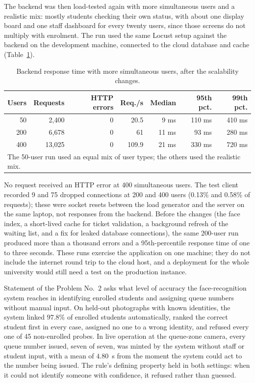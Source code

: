 \documentclass{research}
\begin{document}
The backend was then load-tested again with more simultaneous users and
a realistic mix: mostly students checking their own status, with about
one display board and one staff dashboard for every twenty users, since
those screens do not multiply with enrolment. The run used the same
Locust setup against the backend on the development machine, connected
to the cloud database and cache (Table~\ref{tab:scale-load}).

\begin{table}[H]
\centering
\caption{Backend response time with more simultaneous users, after the
scalability changes.}
\label{tab:scale-load}
\begin{tabular}{rrrrrrr}
\hline
Users & Requests & HTTP errors & Req./s & Median & 95th pct. & 99th pct. \\
\hline
50  & 2,400  & 0 & 20.5  & 9 ms  & 110 ms & 410 ms \\
200 & 6,678  & 0 & 61    & 11 ms & 93 ms  & 280 ms \\
400 & 13,025 & 0 & 109.9 & 21 ms & 330 ms & 720 ms \\
\hline
\multicolumn{7}{l}{\footnotesize The 50-user run used an equal mix of
user types; the others used the realistic mix.} \\
\end{tabular}
\end{table}

\noindent No request received an HTTP error at 400 simultaneous users.
The test client recorded 9 and 75 dropped connections at 200 and 400
users (0.13\% and 0.58\% of requests); these were socket resets between
the load generator and the server on the same laptop, not responses from
the backend. Before the changes (the face index, a short-lived cache
for ticket validation, a background refresh of the waiting list, and a
fix for leaked database connections), the same 200-user run produced
more than a thousand errors and a 95th-percentile response time of one to
three seconds. These runs exercise the application on one machine; they
do not include the internet round trip to the cloud host, and a
deployment for the whole university would still need a test on the
production instance.

\label{subsec:sop2-scope}

Statement of the Problem No.~2 asks what level of accuracy the
face-recognition system reaches in identifying enrolled students and
assigning queue numbers without manual input. On held-out photographs
with known identities, the system linked $97.8\%$ of enrolled students
automatically, ranked the correct student first in every case, assigned
no one to a wrong identity, and refused every one of 45 non-enrolled
probes. In live operation at the queue-zone camera, every queue number
issued, seven of seven, was minted by the system without staff or
student input, with a mean of $4.80$~s from the moment the system could
act to the number being issued. The rule's defining property held in
both settings: when it could not identify someone with confidence, it
refused rather than guessed.
\end{document}
